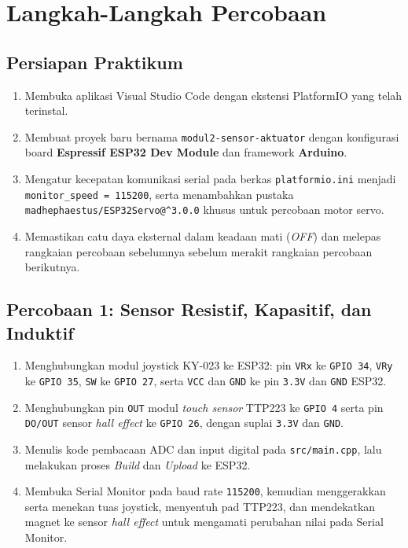 \section{Langkah-Langkah Percobaan}

\subsection{Persiapan Praktikum}
\begin{enumerate}
    \item Membuka aplikasi Visual Studio Code dengan ekstensi PlatformIO yang telah terinstal.
    \item Membuat proyek baru bernama \texttt{modul2-sensor-aktuator} dengan konfigurasi board \textbf{Espressif ESP32 Dev Module} dan framework \textbf{Arduino}.
    \item Mengatur kecepatan komunikasi serial pada berkas \texttt{platformio.ini} menjadi \texttt{monitor\_speed = 115200}, serta menambahkan pustaka \texttt{madhephaestus/ESP32Servo@\^{}3.0.0} khusus untuk percobaan motor servo.
    \item Memastikan catu daya eksternal dalam keadaan mati (\textit{OFF}) dan melepas rangkaian percobaan sebelumnya sebelum merakit rangkaian percobaan berikutnya.
\end{enumerate}

\subsection{Percobaan 1: Sensor Resistif, Kapasitif, dan Induktif}
\begin{enumerate}
    \item Menghubungkan modul joystick KY-023 ke ESP32: pin \texttt{VRx} ke \texttt{GPIO 34}, \texttt{VRy} ke \texttt{GPIO 35}, \texttt{SW} ke \texttt{GPIO 27}, serta \texttt{VCC} dan \texttt{GND} ke pin \texttt{3.3V} dan \texttt{GND} ESP32.
    \item Menghubungkan pin \texttt{OUT} modul \textit{touch sensor} TTP223 ke \texttt{GPIO 4} serta pin \texttt{DO/OUT} sensor \textit{hall effect} ke \texttt{GPIO 26}, dengan suplai \texttt{3.3V} dan \texttt{GND}.
    \item Menulis kode pembacaan ADC dan input digital pada \texttt{src/main.cpp}, lalu melakukan proses \textit{Build} dan \textit{Upload} ke ESP32.
    \item Membuka Serial Monitor pada baud rate \texttt{115200}, kemudian menggerakkan serta menekan tuas joystick, menyentuh pad TTP223, dan mendekatkan magnet ke sensor \textit{hall effect} untuk mengamati perubahan nilai pada Serial Monitor.
\end{enumerate}

